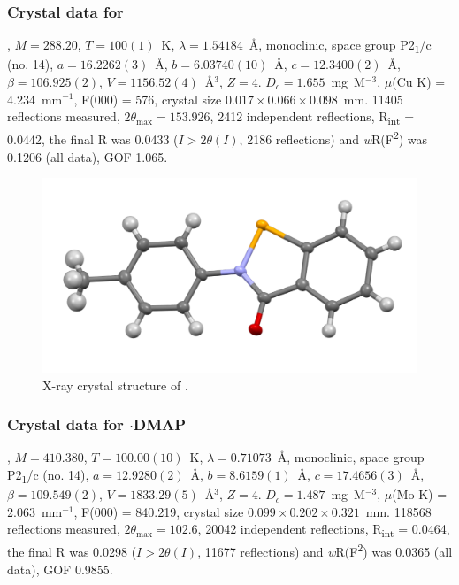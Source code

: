 \begin{refsection}
\subsubsection{Crystal data for \texorpdfstring{}{C14 H11 N O Se}}
, $M=288.20$, $T=100(1)$~K, $\lambda=1.54184$~\AA, monoclinic, space group P2\textsubscript{1}/c (no. 14), $a = 16.2262(3)$~\AA, $b = 6.03740(10)$~\AA, $c = 12.3400(2)$~\AA, $\beta = 106.925(2)$\degree, $V = 1156.52(4)$~\AA$^{3}$, $Z = 4$. $D_{c}= 1.655$~mg~M$^{-3}$, $\mu$(Cu K\a) = 4.234~mm$^{-1}$, F(000) = 576, crystal size $0.017 \times 0.066 \times 0.098$~mm. 11405 reflections measured, $2\theta_{\max}=153.926$\degree, 2412 independent reflections, R\textsubscript{int} = 0.0442, the final R was 0.0433 ($I > 2\theta(I)$, 2186 reflections) and \textit{w}R(F\textsuperscript{2}) was 0.1206 (all data), GOF 1.065.

\begin{figure}
  \includegraphics[width=0.6\linewidth]{Figures/ebs-4me-xtal.pdf}
  \caption{X-ray crystal structure of \texorpdfstring{}{C14 H11 N O Se}.}
\end{figure}

\subsubsection{Crystal data for \texorpdfstring{$ \cdot $DMAP}{C21 H21 N3 O Se}}
, $M=410.380$, $T=100.00(10)$~K, $ \lambda=0.71073 $~\AA, monoclinic, space group P2\textsubscript{1}/c (no. 14), $a = 12.9280(2)$~\AA, $b = 8.6159(1)$~\AA, $c = 17.4656(3)$~\AA, $\beta = 109.549(2)$\degree, $V = 1833.29(5)$~\AA$^{3}$, $Z = 4$. $D_{c}= 1.487$~mg~M$^{-3}$, $\mu$(Mo K\a) = 2.063~mm$^{-1}$, F(000) = 840.219, crystal size $0.099 \times 0.202 \times 0.321$~mm. 118568 reflections measured, $2\theta_{\max}=102.6$\degree, 20042 independent reflections, R\textsubscript{int} = 0.0464, the final R was 0.0298 ($I > 2\theta(I)$, 11677 reflections) and \textit{w}R(F\textsuperscript{2}) was 0.0365 (all data), GOF 0.9855.


\end{refsection}
